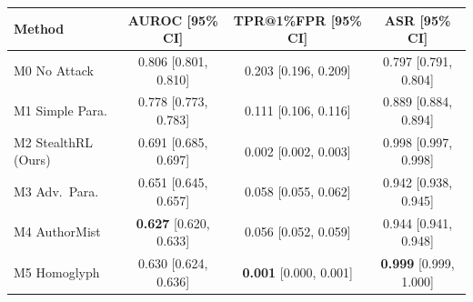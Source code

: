 \begin{tabular}{lccc}
\toprule
Method & AUROC [95\% CI] & TPR@1\%FPR [95\% CI] & ASR [95\% CI] \\
\midrule
M0 No Attack & 0.806 [0.801, 0.810] & 0.203 [0.196, 0.209] & 0.797 [0.791, 0.804] \\
M1 Simple Para. & 0.778 [0.773, 0.783] & 0.111 [0.106, 0.116] & 0.889 [0.884, 0.894] \\
M2 StealthRL (Ours) & 0.691 [0.685, 0.697] & 0.002 [0.002, 0.003] & 0.998 [0.997, 0.998] \\
M3 Adv.\ Para. & 0.651 [0.645, 0.657] & 0.058 [0.055, 0.062] & 0.942 [0.938, 0.945] \\
M4 AuthorMist & \textbf{0.627} [0.620, 0.633] & 0.056 [0.052, 0.059] & 0.944 [0.941, 0.948] \\
M5 Homoglyph & 0.630 [0.624, 0.636] & \textbf{0.001} [0.000, 0.001] & \textbf{0.999} [0.999, 1.000] \\
\bottomrule
\end{tabular}
